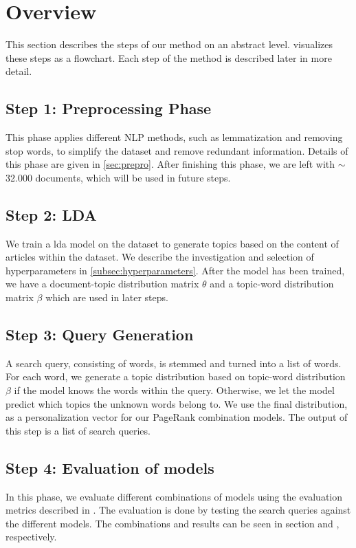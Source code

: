 \section{Overview}\label{sec:method}
This section describes the steps of our method on an abstract level.
 visualizes these steps as a flowchart.
Each step of the method is described later in more detail. 


\subsection*{Step 1: Preprocessing Phase}
This phase applies different \gls{NLP} methods, such as lemmatization and removing stop words, to simplify the dataset and remove redundant information.
Details of this phase are given in \autoref{sec:prepro}.
After finishing this phase, we are left with $\sim$32.000 documents, which will be used in future steps.

\subsection*{Step 2: LDA}
We train a \acrfull{lda} model on the dataset to generate topics based on the content of articles within the dataset. 
We describe the investigation and selection of hyperparameters in \autoref{subsec:hyperparameters}. 
After the model has been trained, we have a document-topic distribution matrix $\theta$ and a topic-word distribution matrix $\beta$ which are used in later steps.

\subsection*{Step 3: Query Generation}
A search query, consisting of words, is stemmed and turned into a list of words.
For each word, we generate a topic distribution based on topic-word distribution $\beta$ if the model knows the words within the query.
Otherwise, we let the model predict which topics the unknown words belong to.
We use the final distribution, as a personalization vector for our PageRank combination models.
The output of this step is a list of search queries.


\subsection*{Step 4: Evaluation of models}
In this phase, we evaluate different combinations of models using the evaluation metrics described in .
The evaluation is done by testing the search queries against the different models. 
The combinations and results can be seen in section  and , respectively.



